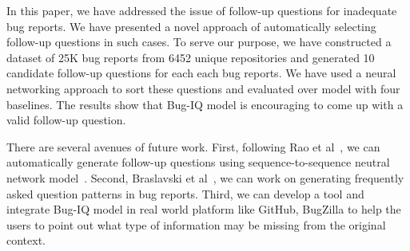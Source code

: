 In this paper, we have addressed the issue of follow-up questions for inadequate bug reports. We have presented a novel approach of automatically selecting follow-up questions in such cases. To serve our purpose, we have constructed a dataset of 25K bug reports from 6452 unique repositories and generated 10 candidate follow-up questions for each each bug reports. We have used a neural networking approach to sort these questions and evaluated over model with four baselines. The results show that Bug-IQ model is encouraging to come up with a valid follow-up question. 

There are several avenues of future work. First, following Rao et al~\cite{rao2019answer}, we can automatically generate follow-up questions using sequence-to-sequence neutral network model~\cite{sutskever2014sequence, yin2015neural, serban2015building}. Second, Braslavski et al~\cite{10.1145/3020165.3022149}, we can work on generating frequently asked question patterns in bug reports. Third, we can develop a tool and integrate Bug-IQ model in real world platform like GitHub, BugZilla to help the users to point out what type of information may be missing from the original context.